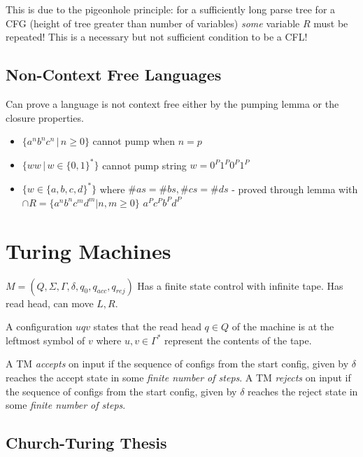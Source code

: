 This is due to the pigeonhole principle: for a sufficiently long parse tree for a CFG (height of tree greater than number of variables) \emph{some} variable $R$ must be repeated!
This is a necessary but not sufficient condition to be a CFL!

\subsection{Non-{}Context Free Languages}
\label{non-contextfreelanguages}

Can prove a language is not context free either by the pumping lemma or the closure properties.

\begin{itemize}
\item $\{ a^nb^nc^n\, |\, n \geq 0 \}$ cannot pump when $n = p$

\item $\{ ww\, |\, w\in \{0,1\}^* \}$ cannot pump string $w = 0^P1^P0^P1^P$

\item $\{ w\in \{a,b,c,d\}^* \}$ where $\#as = \#bs, \#cs = \#ds$ -{} proved through lemma with $\cap R = \{a^nb^nc^md^m|n,m\geq 0\}$ $a^Pc^Pb^Pd^P$

\end{itemize}

\section{Turing Machines}
\label{turingmachines}

$M = (Q,\Sigma,\Gamma,\delta,q_0, q_{acc}, q_{rej})$ Has a finite state control with infinite tape. Has read head, can move $L,R$.

A configuration $uqv$ states that the read head $q\in Q$ of the machine is at the leftmost symbol of $v$ where $u,v\in \Gamma^*$ represent the contents of the tape.

A TM \emph{accepts} on input if the sequence of configs from the start config, given by $\delta$ reaches the accept state in some \emph{finite number of steps}. A TM \emph{rejects} on input if the sequence of configs from the start config, given by $\delta$ reaches the reject state in some \emph{finite number of steps}.

\subsection{Church-{}Turing Thesis}
\label{church-turingthesis}

